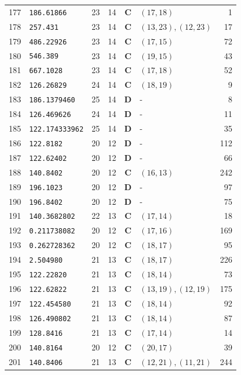 \documentclass[11pt,a4paper]{article}
\begin{document}
\begin{small}
\begin{longtable}{r l c c c l r}
177 & \texttt{186.61866} & 23 & 14 & \textbf{C} & $(17,18)$ & 1 \\
178 & \texttt{257.431} & 23 & 14 & \textbf{C} & $(13,23), (12,23)$ & 17 \\
179 & \texttt{486.22926} & 23 & 14 & \textbf{C} & $(17,15)$ & 72 \\
180 & \texttt{546.389} & 23 & 14 & \textbf{C} & $(19,15)$ & 43 \\
181 & \texttt{667.1028} & 23 & 14 & \textbf{C} & $(17,18)$ & 52 \\
182 & \texttt{126.26829} & 24 & 14 & \textbf{C} & $(18,19)$ & 9 \\
183 & \texttt{186.1379460} & 25 & 14 & \textbf{D} & - & 8 \\
184 & \texttt{126.469626} & 24 & 14 & \textbf{D} & - & 11 \\
185 & \texttt{122.174333962} & 25 & 14 & \textbf{D} & - & 35 \\
186 & \texttt{122.8182} & 20 & 12 & \textbf{D} & - & 112 \\
187 & \texttt{122.62402} & 20 & 12 & \textbf{D} & - & 66 \\
188 & \texttt{140.8402} & 20 & 12 & \textbf{C} & $(16,13)$ & 242 \\
189 & \texttt{196.1023} & 20 & 12 & \textbf{D} & - & 97 \\
190 & \texttt{196.8402} & 20 & 12 & \textbf{D} & - & 75 \\
191 & \texttt{140.3682802} & 22 & 13 & \textbf{C} & $(17,14)$ & 18 \\
192 & \texttt{0.211738082} & 20 & 12 & \textbf{C} & $(17,16)$ & 169 \\
193 & \texttt{0.262728362} & 20 & 12 & \textbf{C} & $(18,17)$ & 95 \\
194 & \texttt{2.504980} & 21 & 13 & \textbf{C} & $(18,17)$ & 226 \\
195 & \texttt{122.22820} & 21 & 13 & \textbf{C} & $(18,14)$ & 73 \\
196 & \texttt{122.62822} & 21 & 13 & \textbf{C} & $(13,19), (12,19)$ & 175 \\
197 & \texttt{122.454580} & 21 & 13 & \textbf{C} & $(18,14)$ & 92 \\
198 & \texttt{126.490802} & 21 & 13 & \textbf{C} & $(18,14)$ & 87 \\
199 & \texttt{128.8416} & 21 & 13 & \textbf{C} & $(17,14)$ & 14 \\
200 & \texttt{140.8164} & 20 & 12 & \textbf{C} & $(20,17)$ & 39 \\
201 & \texttt{140.8406} & 21 & 13 & \textbf{C} & $(12,21), (11,21)$ & 244 \\

\end{longtable}
\end{small}
\end{document}
